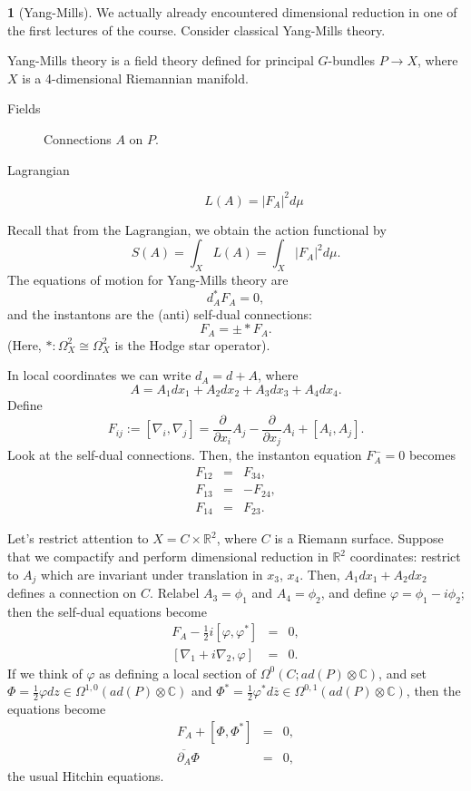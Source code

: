 \documentclass[oneside,english]{amsbook}
\numberwithin{section}{chapter}
\numberwithin{equation}{section}
\numberwithin{figure}{section}
\theoremstyle{plain}
\theoremstyle{definition}
\theoremstyle{remark}
\theoremstyle{definition}
\newtheorem*{example*}{\protect\examplename}
\theoremstyle{definition}
\theoremstyle{plain}
\providecommand{\examplename}{Example}
\begin{document}
\begin{example*}
[Yang-Mills] We actually already encountered dimensional reduction
in one of the first lectures of the course. Consider classical Yang-Mills
theory.

Yang-Mills theory is a field theory defined for principal $G$-bundles
$P\rightarrow X$, where $X$ is a 4-dimensional Riemannian manifold.
\begin{description}
\item [{Fields}] Connections $A$ on $P$.
\item [{Lagrangian}]
\[
L\left(A\right)=\left|F_{A}\right|^{2}d\mu
\]

\end{description}
Recall that from the Lagrangian, we obtain the action functional by
\[
S\left(A\right)=\int_{X}L\left(A\right)=\int_{X}\left|F_{A}\right|^{2}d\mu.
\]
The equations of motion for Yang-Mills theory are
\[
d_{A}^{*}F_{A}=0,
\]
and the instantons are the (anti) self-dual connections:
\[
F_{A}=\pm*F_{A}.
\]
(Here, $*:\Omega_{X}^{2}\cong\Omega_{X}^{2}$ is the Hodge star operator).

In local coordinates we can write $d_{A}=d+A$, where
\[
A=A_{1}dx_{1}+A_{2}dx_{2}+A_{3}dx_{3}+A_{4}dx_{4}.
\]
Define
\[
F_{ij}:=\left[\nabla_{i},\nabla_{j}\right]=\frac{\partial}{\partial x_{i}}A_{j}-\frac{\partial}{\partial x_{j}}A_{i}+\left[A_{i},A_{j}\right].
\]
Look at the self-dual connections. Then, the instanton equation $F_{A}^{-}=0$
becomes
\begin{eqnarray*}
F_{12} & = & F_{34},\\
F_{13} & = & -F_{24},\\
F_{14} & = & F_{23}.
\end{eqnarray*}


Let's restrict attention to $X=C\times\mathbb{R}^{2}$, where $C$
is a Riemann surface. Suppose that we compactify and perform dimensional
reduction in $\mathbb{R}^{2}$ coordinates: restrict to $A_{j}$ which
are invariant under translation in $x_{3}$, $x_{4}$. Then, $A_{1}dx_{1}+A_{2}dx_{2}$
defines a connection on $C$. Relabel $A_{3}=\phi_{1}$ and $A_{4}=\phi_{2}$,
and define $\varphi=\phi_{1}-i\phi_{2}$; then the self-dual equations
become
\begin{eqnarray*}
F_{A}-\frac{1}{2}i\left[\varphi,\varphi^{*}\right] & = & 0,\\
\left[\nabla_{1}+i\nabla_{2},\varphi\right] & = & 0.
\end{eqnarray*}
If we think of $\varphi$ as defining a local section of $\Omega^{0}\left(C;ad(P)\otimes\mathbb{C}\right)$,
and set $\Phi=\frac{1}{2}\varphi dz\in\Omega^{1,0}\left(ad\left(P\right)\otimes\mathbb{C}\right)$
and $\Phi^{*}=\frac{1}{2}\varphi^{*}d\overline{z}\in\Omega^{0,1}\left(ad(P)\otimes\mathbb{C}\right)$,
then the equations become
\begin{eqnarray*}
F_{A}+\left[\Phi,\Phi^{*}\right] & = & 0,\\
\overline{\partial_{A}}\Phi & = & 0,
\end{eqnarray*}
the usual Hitchin equations.
\end{example*}
\end{document}
